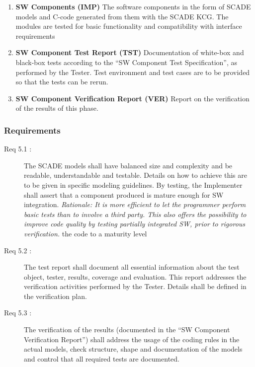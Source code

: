 \documentclass{template/openetcs_article}
\begin{document}
\begin{enumerate}
\item \textbf{SW Components (IMP)} The software components in the form
  of SCADE models and C-code generated from them with the SCADE
  KCG. The modules are tested for basic functionality and
  compatibility with interface requirements 
\item \textbf{SW Component Test Report (TST)} Documentation of white-box and black-box
  tests according to the ``SW Component Test Specification'', as
  performed by the Tester. Test environment and test cases are
  to be provided so that the tests can be rerun. 
\item \textbf{SW Component Verification Report (VER)} Report on the
  verification of the results of this phase.
\end{enumerate}

\subsubsection{Requirements}
\label{sec:5-requirements}

\begin{description}
\item[Req 5.1 {\cite[7.5.4.1 to 7.5.4.4]{EN50128:2011}}:] The SCADE
  models shall have balanced size and complexity and be readable,
  understandable and testable. Details on how to achieve this are to
  be given in specific modeling guidelines. By testing, the
  Implementer shall assert that a component produced is mature enough
  for SW integration. \emph{Rationale: It is more efficient to let the
  programmer perform basic tests than to involve a third party. This
  also offers the possibility to improve code quality by testing
  partially integrated SW, prior to rigorous verification.}
  the code to a maturity level 
\item[Req 5.2 {\cite[6.1.4.5, 7.5.4.7]{EN50128:2011}}:] The test report
  shall document all essential information about the test object,
  tester, results, coverage and evaluation. This report addresses the
  verification activities performed by the Tester. Details shall be defined
  in the verification plan. 
\item[Req 5.3 {\cite[7.5.4.8 to 7.5.4.10]{EN50128:2011}}:] The
  verification of the results (documented in the ``SW Component
  Verification Report'') shall address the usage of the coding rules in
  the actual models, check structure, shape and documentation of the
  models and control that all required tests are documented.
\end{description}
\end{document}
